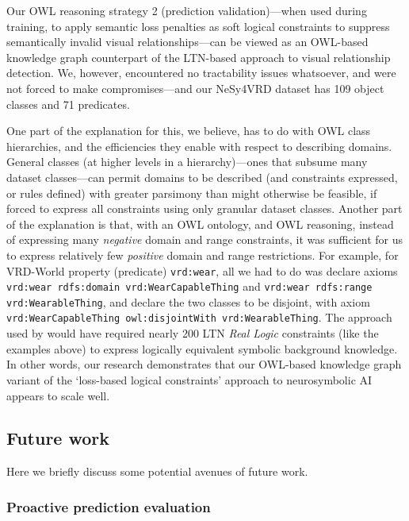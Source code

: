 \documentclass[]{jair}
\begin{document}
Our OWL reasoning strategy 2 (prediction validation)---when used during training, to apply semantic loss penalties as soft logical constraints to suppress semantically invalid visual relationships---can be viewed as an OWL-based knowledge graph counterpart of the \citet{DBLP:conf/ijcnn/DonadelloS19} LTN-based approach to visual relationship detection.
We, however, encountered no tractability issues whatsoever, and were not forced to make compromises---and our NeSy4VRD dataset has 109 object classes and 71 predicates.

One part of the explanation for this, we believe, has to do with OWL class hierarchies, and the efficiencies they enable with respect to describing domains.
General classes (at higher levels in a hierarchy)---ones that subsume many dataset classes---can permit domains to be described (and constraints expressed, or rules defined) with greater parsimony than might otherwise be feasible, if forced to express all constraints using only granular dataset classes.
Another part of the explanation is that, with an OWL ontology, and OWL reasoning, instead of expressing many \emph{negative} domain and range constraints, it was sufficient for us to express relatively few \emph{positive} domain and range restrictions.
For example, for VRD-World property (predicate) \texttt{vrd:wear}, all we had to do was declare axioms \texttt{vrd:wear rdfs:domain vrd:WearCapableThing} and \texttt{vrd:wear rdfs:range vrd:WearableThing}, and declare the two classes to be disjoint, with axiom \texttt{vrd:WearCapableThing owl:disjointWith vrd:WearableThing}.
The approach used by \citet{DBLP:conf/ijcnn/DonadelloS19} would have required nearly 200 LTN \emph{Real Logic} constraints (like the examples above) to express logically equivalent symbolic background knowledge.
In other words, our research demonstrates that our OWL-based knowledge graph variant of the `loss-based logical constraints' approach to neurosymbolic AI appears to scale well.

\subsection{Future work}

Here we briefly discuss some potential avenues of future work.

\subsubsection{Proactive prediction evaluation}
\end{document}
